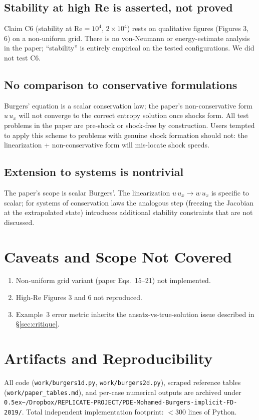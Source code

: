 \documentclass[11pt]{article}
\begin{document}
\subsection{Stability at high Re is asserted, not proved}
Claim C6 (stability at Re\(=10^4\), \(2\!\times\!10^4\)) rests on qualitative
figures (Figures 3, 6) on a non-uniform grid. There is no von-Neumann or
energy-estimate analysis in the paper; ``stability'' is entirely empirical
on the tested configurations. We did not test C6.

\subsection{No comparison to conservative formulations}
Burgers' equation is a scalar conservation law; the paper's non-conservative
form \(u\,u_x\) will not converge to the correct entropy solution once shocks
form. All test problems in the paper are pre-shock or shock-free by
construction. Users tempted to apply this scheme to problems with genuine
shock formation should not: the linearization + non-conservative form will
mis-locate shock speeds.

\subsection{Extension to systems is nontrivial}
The paper's scope is scalar Burgers'. The linearization
\(u\,u_x \to w\,u_x\) is specific to scalar; for systems of conservation
laws the analogous step (freezing the Jacobian at the extrapolated state)
introduces additional stability constraints that are not discussed.

\section{Caveats and Scope Not Covered}
\begin{enumerate}
  \item Non-uniform grid variant (paper Eqs.\ 15--21) not implemented.
  \item High-Re Figures 3 and 6 not reproduced.
  \item Example~3 error metric inherits the ansatz-vs-true-solution issue
        described in \S\ref{sec:critique}.
\end{enumerate}

\section{Artifacts and Reproducibility}
All code (\texttt{work/burgers1d.py}, \texttt{work/burgers2d.py}), scraped
reference tables (\texttt{work/paper\_tables.md}), and per-case numerical
outputs are archived under
\texttt{\raise0.5ex\hbox{\~{}}/Dropbox/REPLICATE-PROJECT/PDE-Mohamed-Burgers-implicit-FD-2019/}.
Total independent implementation footprint: \(<300\) lines of Python.
\end{document}
